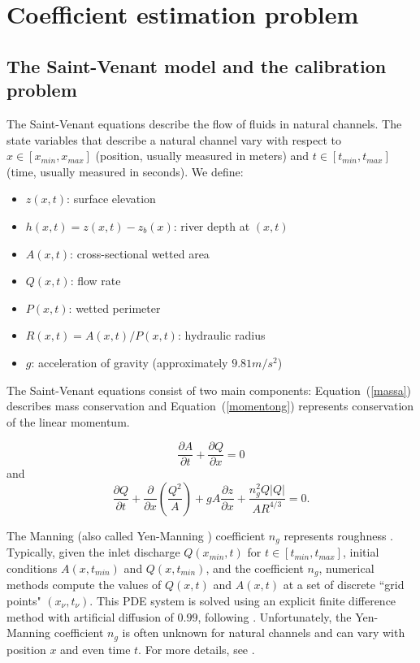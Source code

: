 \documentclass{article}
\begin{document}
\section{Coefficient estimation problem} \label{cap:coeficient_estimation}

\subsection{The Saint-Venant model and the calibration problem}

The Saint-Venant equations \cite{castro,leveque,porto,saintvenant} 
describe the flow of fluids in natural channels. The state variables that describe a natural channel vary
with respect to $x \in [x_{min}, x_{max}]$ (position, usually measured  in meters) and $t \in [t_{min},t_{max}]$ (time, usually
measured in seconds).
We define:

\begin{itemize}
	\item $z(x, t)$: surface elevation
	\item $h(x,t) = z(x,t) - z_b(x)$: river depth at $(x,t)$
	\item $A(x,t)$: cross-sectional wetted area
	\item $Q(x,t)$: flow rate
	\item $P(x,t)$: wetted perimeter
	\item $R(x,t) = A(x,t) / P(x,t)$: hydraulic radius
	\item $g$: acceleration of gravity (approximately $9.81 m/s^2$)
\end{itemize}

The Saint-Venant equations consist of two main components:
Equation~(\ref{massa})
describes mass conservation and Equation~(\ref{momentong}) represents
conservation of the linear momentum.                                


\begin{equation} \label{massa}
	\frac{\partial A}{\partial t} + \frac{\partial Q}{\partial x} = 0
\end{equation}
and
\begin{equation} \label{momentong}
	\frac{\partial Q}{\partial t} + \frac{\partial}{\partial x}
	\left(\frac{Q^2}{A}\right) + g A \frac{\partial z}{\partial x} +
	\frac{n_g^2 Q|Q|}{A R^{4/3}} = 0.
\end{equation} 

The Manning (also called Yen-Manning \cite{bcgmr}) coefficient $n_g$ represents roughness \cite{bcgmr}.
Typically, given the inlet discharge $Q(x_{min}, t)$ for $t \in [t_{min}, t_{max}]$, initial conditions $A(x, t_{min})$ 
and $Q(x, t_{min})$, and the coefficient $n_g$, numerical methods compute the values of $Q(x, t)$ and $A(x, t)$ at a set
of discrete ``grid points" $(x_\nu, t_\nu)$. This PDE system is solved using an explicit finite difference method with artificial diffusion of $0.99$, following \cite{Ferreira2017,leveque,porto}. Unfortunately, the Yen-Manning coefficient $n_g$ is often unknown for natural channels
and can vary with position $x$ and even time $t$. {For more details, see \cite{bcgmr}}.  
\end{document}

